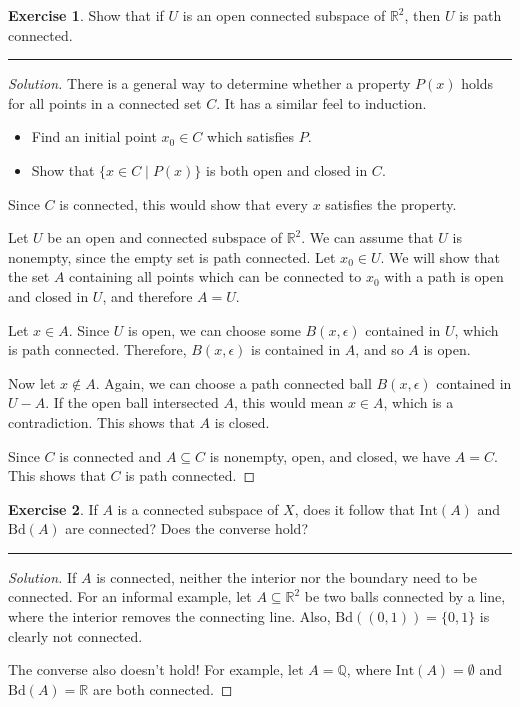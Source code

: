 \documentclass{article}
\theoremstyle{definition}
\newtheorem{exercise}{Exercise}[section]
\begin{document}
\pagebreak

\begin{exercise}
  Show that if $U$ is an open connected subspace of $\mathbb{R}^2$, then $U$ is path connected.
\end{exercise}
\hrule
\begin{proof}[Solution]
  There is a general way to determine whether a property $P(x)$ holds for all points in a connected set $C$. It has a similar feel to induction.
  \begin{itemize}
    \item Find an initial point $x_0\in C$ which satisfies $P$.
    \item Show that $\{x\in C\mid P(x)\}$ is both open and closed in $C$.
  \end{itemize}
  Since $C$ is connected, this would show that every $x$ satisfies the property.

  Let $U$ be an open and connected subspace of $\mathbb{R}^2$. We can assume that $U$ is nonempty, since the empty set is path connected. Let $x_0\in U$. We will show that the set $A$ containing all points which can be connected to $x_0$ with a path is open and closed in $U$, and therefore $A = U$.

  Let $x\in A$. Since $U$ is open, we can choose some $B(x,\epsilon)$ contained in $U$, which is path connected. Therefore, $B(x,\epsilon)$ is contained in $A$, and so $A$ is open.

  Now let $x\notin A$. Again, we can choose a path connected ball $B(x,\epsilon)$ contained in $U - A$. If the open ball intersected $A$, this would mean $x\in A$, which is a contradiction. This shows that $A$ is closed.

  Since $C$ is connected and $A\subseteq C$ is nonempty, open, and closed, we have $A = C$. This shows that $C$ is path connected.
\end{proof}

\pagebreak

\begin{exercise}
  If $A$ is a connected subspace of $X$, does it follow that $\mathrm{Int}(A)$ and $\mathrm{Bd}(A)$ are connected? Does the converse hold?
\end{exercise}
\hrule
\begin{proof}[Solution]
  If $A$ is connected, neither the interior nor the boundary need to be connected. For an informal example, let $A\subseteq\mathbb{R}^2$ be two balls connected by a line, where the interior removes the connecting line. Also, $\mathrm{Bd}((0,1)) = \{0,1\}$ is clearly not connected.

  The converse also doesn't hold! For example, let $A = \mathbb{Q}$, where $\mathrm{Int}(A) = \emptyset$ and $\mathrm{Bd}(A) = \mathbb{R}$ are both connected.
\end{proof}

\pagebreak
\end{document}
